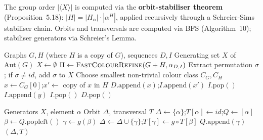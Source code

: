 \documentclass[twoside]{article}
\begin{document}
The group order $|\langle X \rangle|$ is computed via the \textbf{orbit-stabiliser theorem} (Proposition~5.18): $|H| = |H_\alpha| \cdot |\alpha^H|$, applied recursively through a Schreier-Sims stabiliser chain. Orbits and transversals are computed via BFS (Algorithm~10); stabiliser generators via Schreier's Lemma.

\begin{algorithm}[H]
\caption{UpdateGeneratingSet (Algorithm~9 with Lemma~5.11 pruning)}\label{alg:update_genset}
\begin{algorithmic}[1]
\Require Graphs $G, H$ (where $H$ is a copy of $G$), sequences $D, I$
\Ensure Generating set $X$ of $\text{Aut}(G)$
\State $X \gets \emptyset$
    \State $\Pi \gets \textsc{FastColourRefine}(G + H, \alpha_{D,I})$
     \Return \EndIf
        \State Extract permutation $\sigma$; if $\sigma \neq \textit{id}$, add $\sigma$ to $X$
        \State \Return
    \EndIf
    \State Choose smallest non-trivial colour class $C_G, C_H$
    \State $x \gets C_G[0]$;\quad $x' \gets$ copy of $x$ in $H$
    \State {}
    \State $D.\text{append}(x)$;\quad $I.\text{append}(x')$
    \State {}
    \State $I.\text{pop}()$
    \State {}
        \State $I.\text{append}(y)$
        \State {} 
        \State $I.\text{pop}()$
    \EndFor
    \State $D.\text{pop}()$
\EndProcedure
\end{algorithmic}
\end{algorithm}

\begin{algorithm}[H]
\caption{Orbit and Transversal (Algorithm~10)}\label{alg:orbit}
\begin{algorithmic}[1]
\Require Generators $X$, element $\alpha$
\Ensure Orbit $\Delta$, transversal $T$
\State $\Delta \gets \{\alpha\}$;\quad $T[\alpha] \gets \textit{id}$;\quad $Q \gets [\alpha]$
    \State $\beta \gets Q.\text{popleft}()$
        \State $\gamma \gets g(\beta)$
        \If{$\gamma \notin \Delta$}
            \State $\Delta \gets \Delta \cup \{\gamma\}$;\quad $T[\gamma] \gets g \circ T[\beta]$
            \State $Q.\text{append}(\gamma)$
        \EndIf
    \EndFor
\EndWhile
\State \Return $(\Delta, T)$
\end{algorithmic}
\end{algorithm}
\end{document}
